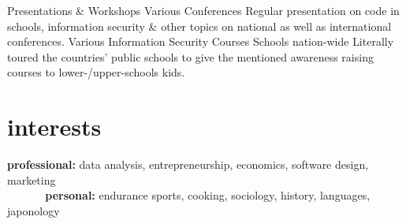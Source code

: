 \documentclass[a4paper]{friggeri-cv} %
\begin{document}
\begin{entrylist}
{Presentations \& Workshops}
{Various Conferences}
{Regular presentation on code in schools, information security \& other topics on national as well as international conferences.}
{Various Information Security Courses}
{Schools nation-wide}
{Literally toured the countries' public schools to give the mentioned awareness raising courses to lower-/upper-schools kids.}
\end{entrylist}


\section{interests}

\textbf{professional:} data analysis, entrepreneurship, economics, software design, marketing \\
\textbf{\ \ \ \ \ \ personal:} endurance sports, cooking, sociology, history, languages, japonology





\end{document}
